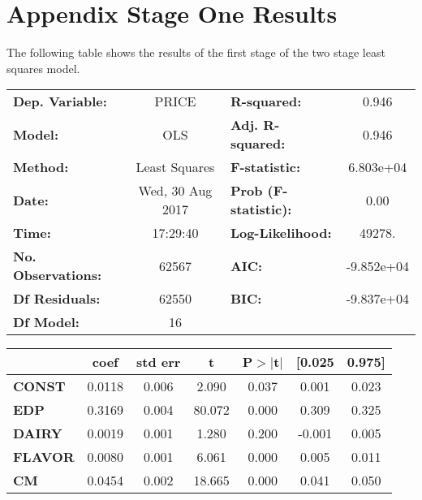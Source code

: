 \documentclass{article}
\begin{document}
\section{Appendix Stage One Results}

The following table shows the results of the first stage of the two stage least squares model.

\begin{center}
\begin{tabular}{lclc}
\toprule
\textbf{Dep. Variable:}    &        PRICE         & \textbf{  R-squared:         } &     0.946   \\
\textbf{Model:}            &       OLS        & \textbf{  Adj. R-squared:    } &     0.946   \\
\textbf{Method:}           &  Least Squares   & \textbf{  F-statistic:       } & 6.803e+04   \\
\textbf{Date:}             & Wed, 30 Aug 2017 & \textbf{  Prob (F-statistic):} &     0.00    \\
\textbf{Time:}             &     17:29:40     & \textbf{  Log-Likelihood:    } &    49278.   \\
\textbf{No. Observations:} &       62567      & \textbf{  AIC:               } & -9.852e+04  \\
\textbf{Df Residuals:}     &       62550      & \textbf{  BIC:               } & -9.837e+04  \\
\textbf{Df Model:}         &          16      & \textbf{                     } &             \\
\bottomrule
\end{tabular}
\begin{tabular}{lcccccc}
               & \textbf{coef} & \textbf{std err} & \textbf{t} & \textbf{P$>$$|$t$|$} & \textbf{[0.025} & \textbf{0.975]}  \\
\midrule
\textbf{CONST} &       0.0118  &        0.006     &     2.090  &         0.037        &        0.001    &        0.023     \\
\textbf{EDP}    &       0.3169  &        0.004     &    80.072  &         0.000        &        0.309    &        0.325     \\
\textbf{DAIRY}    &       0.0019  &        0.001     &     1.280  &         0.200        &       -0.001    &        0.005     \\
\textbf{FLAVOR}    &       0.0080  &        0.001     &     6.061  &         0.000        &        0.005    &        0.011     \\
\textbf{CM}    &       0.0454  &        0.002     &    18.665  &         0.000        &        0.041    &        0.050     \\

\end{tabular}
\end{center}
\end{document}
